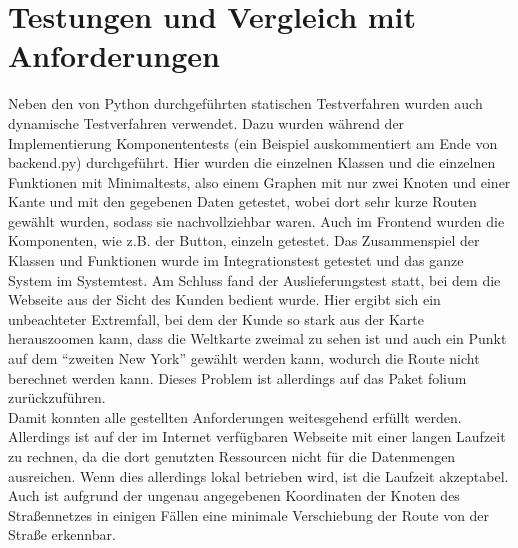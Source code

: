 \documentclass[a4paper,12pt,ngerman]{scrartcl}
\begin{document}
\newpage
\section{Testungen und Vergleich mit Anforderungen}
Neben den von Python durchgeführten statischen Testverfahren wurden auch dynamische Testverfahren verwendet. Dazu wurden während der Implementierung Komponententests (ein Beispiel auskommentiert am Ende von backend.py) durchgeführt. Hier wurden die einzelnen Klassen und die einzelnen Funktionen mit Minimaltests, also einem Graphen mit nur zwei Knoten und einer Kante und mit den gegebenen Daten getestet, wobei dort sehr kurze Routen gewählt wurden, sodass sie nachvollziehbar waren. Auch im Frontend wurden die Komponenten, wie z.B. der Button, einzeln getestet. Das Zusammenspiel der Klassen und Funktionen wurde im Integrationstest getestet und das ganze System im Systemtest. Am Schluss fand der Auslieferungstest statt, bei dem die Webseite aus der Sicht des Kunden bedient wurde. Hier ergibt sich ein unbeachteter Extremfall, bei dem der Kunde so stark aus der Karte herauszoomen kann, dass die Weltkarte zweimal zu sehen ist und auch ein Punkt auf dem “zweiten New York” gewählt werden kann, wodurch die Route nicht berechnet werden kann. Dieses Problem ist allerdings auf das Paket folium zurückzuführen. \\
Damit konnten alle gestellten Anforderungen weitesgehend erfüllt werden. Allerdings ist auf der im Internet verfügbaren Webseite mit einer langen Laufzeit zu rechnen, da die dort genutzten Ressourcen nicht für die Datenmengen ausreichen. Wenn dies allerdings lokal betrieben wird, ist die Laufzeit akzeptabel. Auch ist aufgrund der ungenau angegebenen Koordinaten der Knoten des Straßennetzes in einigen Fällen eine minimale Verschiebung der Route von der Straße erkennbar.
\end{document}
